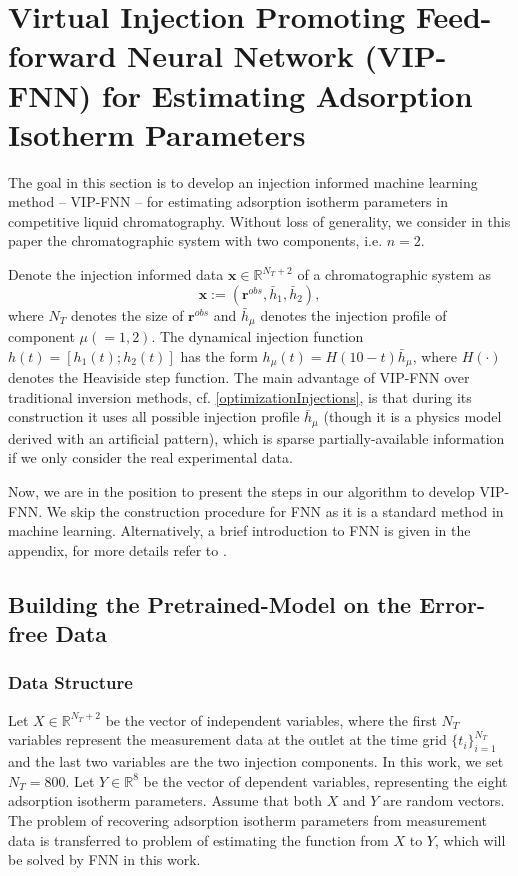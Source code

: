 \documentclass[thmsa,onecolumn,12pt]{article}%
\begin{document}
\section{Virtual Injection Promoting Feed-forward Neural Network (VIP-FNN) for Estimating Adsorption \\ Isotherm Parameters}
\label{FNN}

The goal in this section is to develop an injection informed machine learning method -- VIP-FNN -- for estimating adsorption isotherm parameters in competitive liquid chromatography. Without loss of generality, we consider in this paper the chromatographic system with two components, i.e. $n=2$.

Denote the injection informed data $\mathbf{x}\in \mathbb{R}^{N_T+2}$ of a chromatographic system as
\begin{equation}
\mathbf{x} := (\mathbf{r}^{obs}, \bar{h}_1, \bar{h}_2),
\label{y}
\end{equation}
where $N_T$ denotes the size of $\mathbf{r}^{obs}$ and $\bar{h}_\mu$ denotes the injection profile of component $\mu(=1,2)$. The dynamical injection function $h(t)=[h_1(t); h_2(t)]$ has the form $h_\mu(t)= H(10-t) \bar{h}_\mu$, where $H(\cdot)$ denotes the Heaviside step function. The main advantage of VIP-FNN over traditional inversion methods, cf. \eqref{optimizationInjections}, is that during its construction it uses all possible injection profile $\bar{h}_\mu$ (though it is a physics model derived with an artificial pattern), which is sparse partially-available information if we only consider the real experimental data.

Now, we are in the position to present the steps in our algorithm to develop VIP-FNN. We skip the construction procedure for FNN as it is a standard method in machine learning. Alternatively, a brief introduction to FNN is given in the appendix, for more details refer to \cite{Bishop06,Svozil1990}.


\subsection{Building the Pretrained-Model on the Error-free Data}
\subsubsection{Data Structure}
\label{data_structure}
Let $X\in \mathbb{R}^{N_T+2}$ be the vector of independent variables, where the first $N_T$ variables represent the measurement data at the outlet at the time grid $\{t_i\}^{N_T}_{i=1}$ and the last two variables are the two injection components. In this work, we set $N_T=800$. Let $Y\in \mathbb{R}^{8}$ be the vector of dependent variables, representing the eight adsorption isotherm parameters. Assume that both $X$ and $Y$ are random vectors. The problem of recovering adsorption isotherm parameters from measurement data is transferred to problem of estimating the function from $X$ to $Y$, which will be solved by FNN in this work.
\end{document}
